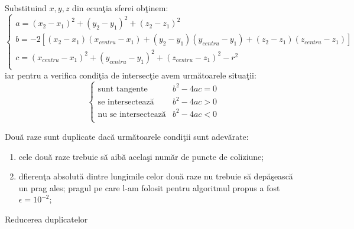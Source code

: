 	
	Substituind $x, y, z$ din ecua\c{t}ia sferei ob\c{t}inem:
	\begin{equation}
		\begin{cases}
			a = (x_2 - x_1)^2 + (y_2 - y_1)^2 + (z_2 - z_1)^2\\
			b = -2[(x_2-x_1)(x_{centru}-x_1) + (y_2 - y_1)(y_{centru} - y_1) + (z_2 - z_1)(z_{centru} - z_1)]\\
			c = (x_{centru}-x_1)^2 + (y_{centru}-y_1)^2 + (z_{centru}-z_1)^2 - r^2\\
		\end{cases}
	\end{equation}
	iar pentru a verifica condi\c{t}ia de intersec\c{t}ie avem urm\u{a}toarele situa\c{t}ii:
	\begin{equation}
		\begin{cases}
			\text{sunt tangente} & b^2-4ac = 0\\
			\text{se intersecteaz\u{a}}& b^2-4ac>0\\
			\text{nu se intersecteaz\u{a}}& b^2-4ac<0\\
		\end{cases}
	\end{equation}
	 
	
	Dou\u{a} raze sunt duplicate dac\u{a} urm\u{a}toarele condi\c{t}ii sunt adev\u{a}rate:
	
	\begin{enumerate}
		\item cele dou\u{a} raze trebuie s\u{a} aib\u{a} acela\c{s}i num\u{a}r de puncte de coliziune;
		
		\item dfieren\c{t}a absolut\u{a} dintre lungimile celor dou\u{a} raze nu trebuie s\u{a} dep\u{a}\c{s}easc\u{a} un prag ales; pragul pe care l-am folosit pentru algoritmul propus a fost $\epsilon = 10^{-2}$;
	\end{enumerate}
	 
	
	\begin{algorithm}
		\caption{Reducerea duplicatelor}
		\label{duplicate}
		\begin{algorithmic}[2]	
			\EndIf
			\EndWhile
			\EndProcedure
		\end{algorithmic}
	\end{algorithm}
	 

